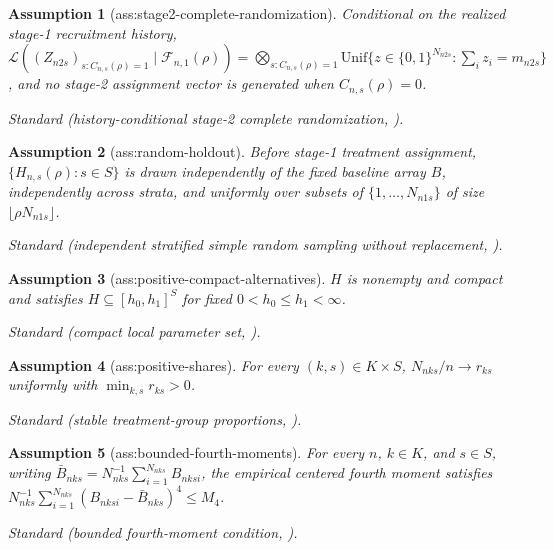 \documentclass{article}
\newtheorem{assumption}{Assumption}
\begin{document}
\begin{assumption}[ass:stage2-complete-randomization]\label{ass:stage2-complete-randomization}
Conditional on the realized stage-1 recruitment history, \(\mathcal L((Z_{n2s})_{s:C_{n,s}(\rho)=1}\mid\mathcal F_{n,1}(\rho))=\bigotimes_{s:C_{n,s}(\rho)=1}\mathrm{Unif}\{z\in\{0,1\}^{N_{n2s}}:\sum_i z_i=m_{n2s}\}\), and no stage-2 assignment vector is generated when \(C_{n,s}(\rho)=0\).
\par\smallskip\noindent\emph{Standard} (history-conditional stage-2 complete randomization, \cite{FreidlingZhaoGao2026SelectiveRI}).
\end{assumption}

\begin{assumption}[ass:random-holdout]\label{ass:random-holdout}
Before stage-1 treatment assignment, \(\{H_{n,s}(\rho):s\in S\}\) is drawn independently of the fixed baseline array \(B\), independently across strata, and uniformly over subsets of \(\{1,\ldots,N_{n1s}\}\) of size \(\lfloor\rho N_{n1s}\rfloor\).
\par\smallskip\noindent\emph{Standard} (independent stratified simple random sampling without replacement, \cite{LiDing2017FinitePopulationCLT}).
\end{assumption}

\begin{assumption}[ass:positive-compact-alternatives]\label{ass:positive-compact-alternatives}
\(H\) is nonempty and compact and satisfies \(H\subseteq[h_0,h_1]^S\) for fixed \(0<h_0\le h_1<\infty\).
\par\smallskip\noindent\emph{Standard} (compact local parameter set, \cite{TianTaylor2018RandomizedResponse}).
\end{assumption}

\begin{assumption}[ass:positive-shares]\label{ass:positive-shares}
For every \((k,s)\in K\times S\), \(N_{nks}/n\to r_{ks}\) uniformly with \(\min_{k,s}r_{ks}>0\).
\par\smallskip\noindent\emph{Standard} (stable treatment-group proportions, \cite{LiDing2017FinitePopulationCLT}).
\end{assumption}

\begin{assumption}[ass:bounded-fourth-moments]\label{ass:bounded-fourth-moments}
For every \(n\), \(k\in K\), and \(s\in S\), writing \(\bar B_{nks}=N_{nks}^{-1}\sum_{i=1}^{N_{nks}}B_{nksi}\), the empirical centered fourth moment satisfies \(N_{nks}^{-1}\sum_{i=1}^{N_{nks}}(B_{nksi}-\bar B_{nks})^4\le M_4\).
\par\smallskip\noindent\emph{Standard} (bounded fourth-moment condition, \cite{ShiDing2025BerryEsseen}).
\end{assumption}
\end{document}
